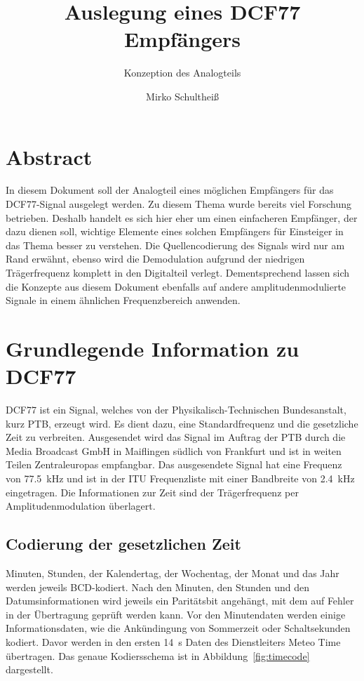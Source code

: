 \documentclass[a4paper]{scrartcl}
\author{Mirko Schultheiß}
\title{Auslegung eines DCF77 Empfängers}
\subtitle{Konzeption des Analogteils}
\begin{document}
\maketitle
\clearpage
\tableofcontents
\listoffigures
\clearpage
\section{Abstract}
In diesem Dokument soll der Analogteil eines möglichen Empfängers für das DCF77-Signal ausgelegt werden.
Zu diesem Thema wurde bereits viel Forschung betrieben.
Deshalb handelt es sich hier eher um einen einfacheren Empfänger, der dazu dienen soll, wichtige Elemente eines solchen Empfängers für Einsteiger in das Thema besser zu verstehen.
Die Quellencodierung des Signals wird nur am Rand erwähnt, ebenso wird die Demodulation aufgrund der niedrigen Trägerfrequenz komplett in den Digitalteil verlegt.
Dementsprechend lassen sich die Konzepte aus diesem Dokument ebenfalls auf andere amplitudenmodulierte Signale in einem ähnlichen Frequenzbereich anwenden.

\section{Grundlegende Information zu DCF77}

DCF77 ist ein Signal, welches von der Physikalisch-Technischen Bundesanstalt, kurz PTB, erzeugt wird. Es dient dazu, eine Standardfrequenz und die gesetzliche Zeit zu verbreiten.
Ausgesendet wird das Signal im Auftrag der PTB durch die Media Broadcast GmbH in Maiflingen südlich von Frankfurt und ist in weiten Teilen Zentraleuropas empfangbar.
Das ausgesendete Signal hat eine Frequenz von \qty{77.5}{\kHz} und ist in der ITU Frequenzliste mit einer Bandbreite von \qty{2.4}{\kHz} eingetragen.
Die Informationen zur Zeit sind der Trägerfrequenz per Amplitudenmodulation überlagert.~\cite{piester_zeit-_2004}

\subsection{Codierung der gesetzlichen Zeit}
Minuten, Stunden, der Kalendertag, der Wochentag, der Monat und das Jahr werden jeweils BCD-kodiert. Nach den Minuten, den Stunden und den Datumsinformationen wird jeweils ein Paritätsbit angehängt, mit dem auf Fehler in der Übertragung geprüft werden kann. Vor den Minutendaten werden einige Informationsdaten, wie die Ankündingung von Sommerzeit oder Schaltsekunden kodiert. Davor werden in den ersten \qty{14}{\s} Daten des Dienstleiters Meteo Time übertragen. Das genaue Kodiersschema ist in Abbildung~\ref{fig:timecode} dargestellt.
\end{document}

